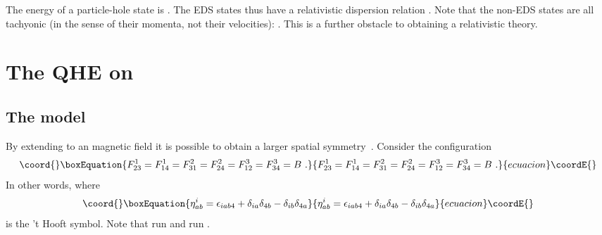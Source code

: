 \documentclass[a4paper,12pt]{article}
\providecommand{\R}{R}
\providecommand{\sect}[1]{\section{#1}\setcounter{equation}{0}}
\begin{document}
The energy of a particle-hole state is \coordHE{}.  The EDS states thus have a relativistic dispersion relation
\coordHE{}.  Note that the non-EDS states are all tachyonic (in the
sense of their momenta, not their velocities):
\coordHE{}.  This is a further obstacle to obtaining a
relativistic theory.


\sect{The \coordHE{} QHE on \myHighlight{$\R^4$}\coordHE{}}

\subsection{The model}

By extending to an \coordHE{} magnetic field it is possible to obtain a
larger spatial symmetry~\cite{hz1}.  Consider the configuration
\begin{equation}\coord{}\boxEquation{
F^1_{23} = F^1_{14} = F^{2}_{31} = F^2_{24} = F^3_{12} = F^3_{34} = B\ .
\label{su2mag}
}{
F^1_{23} = F^1_{14} = F^{2}_{31} = F^2_{24} = F^3_{12} = F^3_{34} = B\ .
}{ecuacion}\coordE{}\end{equation}
In other words, \coordHE{} where
\begin{equation}\coord{}\boxEquation{
\eta^i_{ab} = \epsilon_{iab 4} + \delta_{ia} \delta_{4b}
- \delta_{ib} \delta_{4a}
}{
\eta^i_{ab} = \epsilon_{iab 4} + \delta_{ia} \delta_{4b}
- \delta_{ib} \delta_{4a}
}{ecuacion}\coordE{}\end{equation}
is the 't Hooft symbol.  Note that \coordHE{} run \coordHE{}
and \coordHE{} run \coordHE{}.
\end{document}
